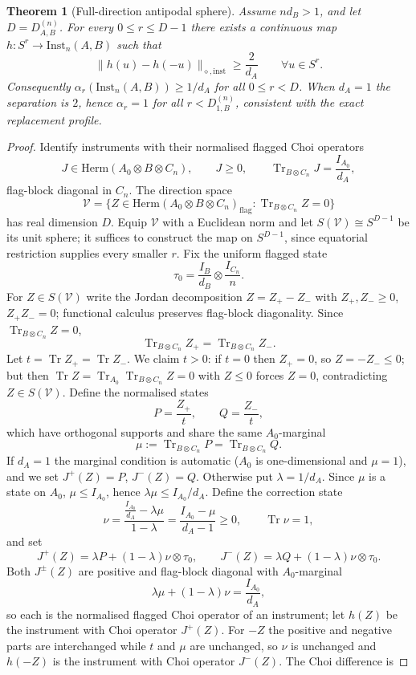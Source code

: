 \documentclass[11pt,a4paper]{article}
\newtheorem{theorem}{Theorem}[section]
\newcommand{\Herm}{\mathrm{Herm}}
\newcommand{\Inst}{\mathrm{Inst}}
\newcommand{\Tr}{\operatorname{Tr}}
\begin{document}
\begin{theorem}[Full-direction antipodal sphere]
\label{thm:full-direction}
Assume $nd_B>1$, and let $D=D_{A,B}^{(n)}$. For every $0\le r\le D-1$ there exists a continuous map $h:S^r\to\Inst_n(A,B)$ such that
\[
\|h(u)-h(-u)\|_{\diamond,\mathrm{inst}}\ge\frac2{d_A}
\qquad\forall u\in S^r.
\]
Consequently $\alpha_r(\Inst_n(A,B))\ge1/d_A$ for all $0\le r<D$. When $d_A=1$ the separation is $2$, hence $\alpha_r=1$ for all $r<D_{1,B}^{(n)}$, consistent with the exact replacement profile.
\end{theorem}

\begin{proof}
Identify instruments with their normalised flagged Choi operators
\[
J\in\Herm(A_0\otimes B\otimes C_n),\qquad J\ge0,\qquad
\Tr_{B\otimes C_n}J=\frac{I_{A_0}}{d_A},
\]
flag-block diagonal in $C_n$. The direction space
\[
\mathcal V=\big\{Z\in\Herm(A_0\otimes B\otimes C_n)_{\mathrm{flag}}:\Tr_{B\otimes C_n}Z=0\big\}
\]
has real dimension $D$. Equip $\mathcal V$ with a Euclidean norm and let $S(\mathcal V)\cong S^{D-1}$ be its unit sphere; it suffices to construct the map on $S^{D-1}$, since equatorial restriction supplies every smaller $r$. Fix the uniform flagged state
\[
\tau_0=\frac{I_B}{d_B}\otimes\frac{I_{C_n}}n.
\]
For $Z\in S(\mathcal V)$ write the Jordan decomposition $Z=Z_+-Z_-$ with $Z_+,Z_-\ge0$, $Z_+Z_-=0$; functional calculus preserves flag-block diagonality. Since $\Tr_{B\otimes C_n}Z=0$,
\[
\Tr_{B\otimes C_n}Z_+=\Tr_{B\otimes C_n}Z_-.
\]
Let $t=\Tr Z_+=\Tr Z_-$. We claim $t>0$: if $t=0$ then $Z_+=0$, so $Z=-Z_-\le0$; but then $\Tr Z=\Tr_{A_0}\Tr_{B\otimes C_n}Z=0$ with $Z\le0$ forces $Z=0$, contradicting $Z\in S(\mathcal V)$. Define the normalised states
\[
P=\frac{Z_+}{t},\qquad Q=\frac{Z_-}{t},
\]
which have orthogonal supports and share the same $A_0$-marginal
\[
\mu:=\Tr_{B\otimes C_n}P=\Tr_{B\otimes C_n}Q.
\]
If $d_A=1$ the marginal condition is automatic ($A_0$ is one-dimensional and $\mu=1$), and we set $J^+(Z)=P$, $J^-(Z)=Q$. Otherwise put $\lambda=1/d_A$. Since $\mu$ is a state on $A_0$, $\mu\le I_{A_0}$, hence $\lambda\mu\le I_{A_0}/d_A$. Define the correction state
\[
\nu=\frac{\frac{I_{A_0}}{d_A}-\lambda\mu}{1-\lambda}
=\frac{I_{A_0}-\mu}{d_A-1}\ge0,
\qquad \Tr\nu=1,
\]
and set
\[
J^+(Z)=\lambda P+(1-\lambda)\nu\otimes\tau_0,\qquad
J^-(Z)=\lambda Q+(1-\lambda)\nu\otimes\tau_0.
\]
Both $J^\pm(Z)$ are positive and flag-block diagonal with $A_0$-marginal
\[
\lambda\mu+(1-\lambda)\nu=\frac{I_{A_0}}{d_A},
\]
so each is the normalised flagged Choi operator of an instrument; let $h(Z)$ be the instrument with Choi operator $J^+(Z)$. For $-Z$ the positive and negative parts are interchanged while $t$ and $\mu$ are unchanged, so $\nu$ is unchanged and $h(-Z)$ is the instrument with Choi operator $J^-(Z)$. The Choi difference is

\end{proof}
\end{document}
